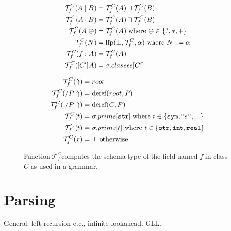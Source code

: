 \documentclass[a4paper]{article}
\begin{document}
\def\mytypejoin{\ensuremath{\sqcup}}
\def\mytypemeet{\ensuremath{\sqcap}}
\def\mytypebottom{\ensuremath{\bot}}
\def\mytypetop{\ensuremath{\top}}
\def\typeof{\ensuremath{\mathcal{T}}}
\def\typeoff{\ensuremath{\typeof^C_f}}
\begin{figure}
\begin{minipage}[t]{0.4\textwidth}
\begin{align*}
\typeoff(A\mid B) &= \typeoff(A) \mytypejoin  \typeoff(B)\\
\typeoff(A\cdot B) &= \typeoff(A) \mytypemeet  \typeoff(B)\\
\typeoff(A\;\oplus) &= \typeoff(A) \text{ where } \oplus \in \{?, *, +\}\\
\typeoff(N) &= \fixpoint(\mytypebottom, \typeoff, \alpha) \text{ where } N ::= \alpha\\
\typeoff(f: A) &= \typeoff(A)\\
\typeoff([C'] A) &= \sigma.classes[C']\\
\end{align*}
\end{minipage}
\begin{minipage}[t]{0.6\textwidth}
\begin{align*}
\typeoff(\Uparrow) &= root\\
\typeoff(/P\Uparrow) &= \text{deref}(root, P)\\
\typeoff(./P\Uparrow) &= \text{deref}(C, P)\\
\typeoff(t) &= \sigma.prims[\text{\texttt{str}}] \text{ where } t\in\{\text{\texttt{sym}}, \literal{s}, ...\}\\
\typeoff(t) &= \sigma.prims[t] \text{ where } t\in \{\text{\texttt{str}}, \text{\texttt{int}}, \text{\texttt{real}} \}\\
\typeoff(x) &= \mytypetop \text{ otherwise}
\end{align*}
\end{minipage}
\caption{Function \typeoff computes the schema type of the field named
  $f$ in class $C$ as used in a grammar.\label{FIG:typeof}}
\end{figure}



\section{Parsing}

General: left-recursion etc., infinite lookahead. GLL. 
\end{document}

